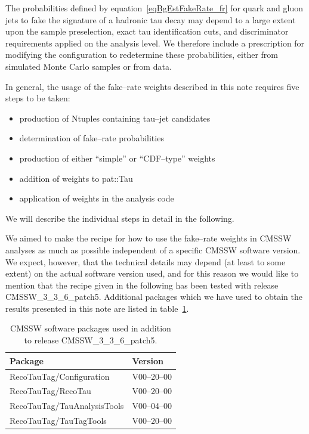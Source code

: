 The probabilities defined by equation~\ref{eqBgEstFakeRate_fr} for quark
and gluon jets to fake the signature of a hadronic tau decay may depend to a
large extent upon the sample preselection, exact tau identification cuts, and discriminator
requirements applied on the analysis level. We therefore include a prescription 
for modifying the configuration to redetermine these probabilities, either from simulated
Monte Carlo samples or from data.

In general, the usage of the fake--rate weights described in this note requires
five steps to be taken:
\begin{itemize}
\item production of Ntuples containing tau--jet candidates
\item determination of fake--rate probabilities
\item production of either ``simple'' or ``CDF--type'' weights 
\item addition of weights to pat::Tau 
\item application of weights in the analysis code
\end{itemize}
We will describe the individual steps in detail in the following.

We aimed to make the recipe for how to use the fake--rate weights in CMSSW
analyses as much as possible independent of a specific CMSSW software version.
We expect, however, that the technical details may depend (at least to some
extent) on the actual software version used, and for this reason we would like
to mention that the recipe given in the following has been tested with release
CMSSW\_3\_3\_6\_patch5.  Additional packages which we have used to obtain the
results presented in this note are listed in
table~\ref{tabBgEstFakeRate_cmsswTags}.

\begin{table}[t]
\begin{center}
\tablesize
\begin{tabular}{|l|l|}
\hline
Package & Version \\
\hline
RecoTauTag/Configuration    & V00--20--00 \\
RecoTauTag/RecoTau          & V00--20--00 \\
RecoTauTag/TauAnalysisTools & V00--04--00 \\
RecoTauTag/TauTagTools      & V00--20--00 \\
\hline
\end{tabular}
\end{center}
\begin{center}
\caption{\captiontext CMSSW software packages used in addition to release CMSSW\_3\_3\_6\_patch5.}
\label{tabBgEstFakeRate_cmsswTags}
\end{center}
\end{table}

